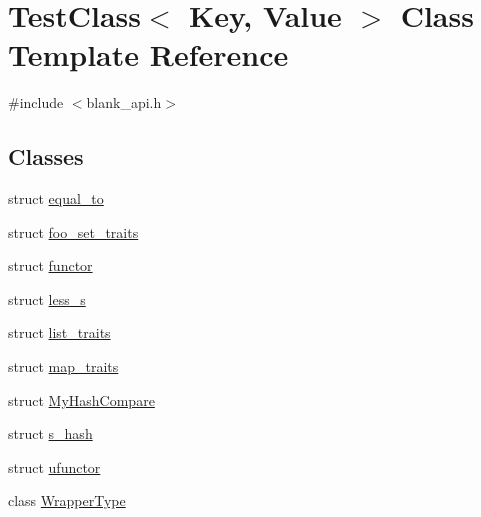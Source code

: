 \hypertarget{class_test_class}{}\section{Test\+Class$<$ Key, Value $>$ Class Template Reference}
\label{class_test_class}


{\ttfamily \#include $<$blank\+\_\+api.\+h$>$}

\subsection*{Classes}
\begin{DoxyCompactItemize}
\item 
struct \hyperlink{struct_test_class_1_1equal__to}{equal\+\_\+to}
\item 
struct \hyperlink{struct_test_class_1_1foo__set__traits}{foo\+\_\+set\+\_\+traits}
\item 
struct \hyperlink{struct_test_class_1_1functor}{functor}
\item 
struct \hyperlink{struct_test_class_1_1less__s}{less\+\_\+s}
\item 
struct \hyperlink{struct_test_class_1_1list__traits}{list\+\_\+traits}
\item 
struct \hyperlink{struct_test_class_1_1map__traits}{map\+\_\+traits}
\item 
struct \hyperlink{struct_test_class_1_1_my_hash_compare}{My\+Hash\+Compare}
\item 
struct \hyperlink{struct_test_class_1_1s__hash}{s\+\_\+hash}
\item 
struct \hyperlink{struct_test_class_1_1ufunctor}{ufunctor}
\item 
class \hyperlink{class_test_class_1_1_wrapper_type}{Wrapper\+Type}
\end{DoxyCompactItemize}

